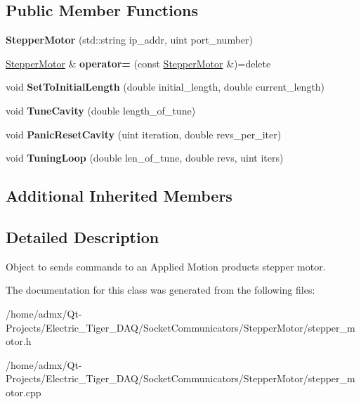 \subsection*{Public Member Functions}
\begin{DoxyCompactItemize}
\item 
\hypertarget{class_stepper_motor_a60b5baede3214f0774dd4fe166ab6bd5}{{\bfseries Stepper\+Motor} (std\+::string ip\+\_\+addr, uint port\+\_\+number)}\label{class_stepper_motor_a60b5baede3214f0774dd4fe166ab6bd5}

\item 
\hypertarget{class_stepper_motor_aeeceb8eefbcffef0cb0c2b742ffe3603}{\hyperlink{class_stepper_motor}{Stepper\+Motor} \& {\bfseries operator=} (const \hyperlink{class_stepper_motor}{Stepper\+Motor} \&)=delete}\label{class_stepper_motor_aeeceb8eefbcffef0cb0c2b742ffe3603}

\item 
\hypertarget{class_stepper_motor_aa3782b6fa0a79f6e30c1547b23e62a76}{void {\bfseries Set\+To\+Initial\+Length} (double initial\+\_\+length, double current\+\_\+length)}\label{class_stepper_motor_aa3782b6fa0a79f6e30c1547b23e62a76}

\item 
\hypertarget{class_stepper_motor_a94ae4b10d58ea4dde277c05acf444bdf}{void {\bfseries Tune\+Cavity} (double length\+\_\+of\+\_\+tune)}\label{class_stepper_motor_a94ae4b10d58ea4dde277c05acf444bdf}

\item 
\hypertarget{class_stepper_motor_a260af15a346488150de82fa3801df94c}{void {\bfseries Panic\+Reset\+Cavity} (uint iteration, double revs\+\_\+per\+\_\+iter)}\label{class_stepper_motor_a260af15a346488150de82fa3801df94c}

\item 
\hypertarget{class_stepper_motor_a6e140a11cb19bac6819978b5bb6d5a4d}{void {\bfseries Tuning\+Loop} (double len\+\_\+of\+\_\+tune, double revs, uint iters)}\label{class_stepper_motor_a6e140a11cb19bac6819978b5bb6d5a4d}

\end{DoxyCompactItemize}
\subsection*{Additional Inherited Members}


\subsection{Detailed Description}
Object to sends commands to an Applied Motion products stepper motor. 

The documentation for this class was generated from the following files\+:\begin{DoxyCompactItemize}
\item 
/home/admx/\+Qt-\/\+Projects/\+Electric\+\_\+\+Tiger\+\_\+\+D\+A\+Q/\+Socket\+Communicators/\+Stepper\+Motor/stepper\+\_\+motor.\+h\item 
/home/admx/\+Qt-\/\+Projects/\+Electric\+\_\+\+Tiger\+\_\+\+D\+A\+Q/\+Socket\+Communicators/\+Stepper\+Motor/stepper\+\_\+motor.\+cpp\end{DoxyCompactItemize}
